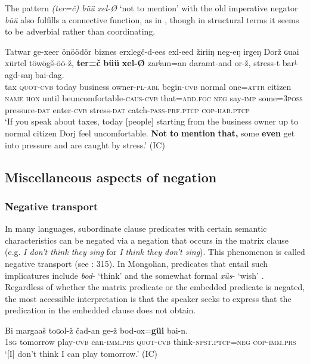 \documentclass[output=paper,colorlinks,citecolor=brown,chinesefont]{langscibook}
\begin{document}
The pattern \textit{(ter=č) büü xel-Ø} ‘not to mention’ with the old imperative negator \textit{büü} also fulfills a connective function, as in , though in structural terms it seems to be adverbial rather than coordinating.

\ea\label{ex:kha:83}
    \gll Tatwar ge-xeer önöödör biznes erxlegč-d-ees exl-eed žiriiŋ neg-eŋ irgeŋ Dorž ɢuai xürtel töwögš-öö-ž, \textbf{ter=č} \textbf{büü} \textbf{xel-Ø} zarʲam=an daramt-and or-ž, stress-t barʲ-agd-saŋ bai-dag. \\ 
         tax {\textsc{quot-cvb}} today business owner-\textsc{pl-abl} begin-\textsc{cvb} normal one=\textsc{attr} citizen \textsc{name} \textsc{hon} until be\textunderscore uncomfortable-\textsc{caus-cvb} that=\textsc{add.foc} \textsc{neg} say-\textsc{imp} some=\textsc{3poss} pressure-\textsc{dat} enter-\textsc{cvb} stress-\textsc{dat} catch-\textsc{pass-prf.ptcp} \textsc{cop-hab.ptcp} \\
    \glt ‘If you speak about taxes, today [people] starting from the business owner up to normal citizen Dorj feel uncomfortable. \textbf{Not} \textbf{to} \textbf{mention} \textbf{that,} some \textbf{even} get into pressure and are caught by stress.’ (IC)
\z

\subsection{Miscellaneous aspects of negation}\label{sec:kha:4.6}
\subsubsection{Negative transport}\label{sec:kha:4.6.1} 
\largerpage

In many languages, subordinate clause predicates with certain semantic characteristics can be negated via a negation that occurs in the matrix clause (e.g. \textit{I don’t think they sing} for \textit{I think they don't sing}). This phenomenon is called negative transport (see \citealt{Horn1989}: 315). In Mongolian, predicates that entail such implicatures include \textit{bod}{}- ‘think’  and the somewhat formal \textit{xüs}{}- ‘wish’ . Regardless of whether the matrix predicate or the embedded predicate is negated, the most accessible interpretation is that the speaker seeks to express that the predication in the embedded clause does not obtain.

\ea\label{ex:kha:84}
    \ea\label{ex:kha:84a}
        \gll Bi margaaš toɢol-ž čad-an ge-ž bod-ox=\textbf{güi} bai-n.\\ 
             \textsc{1sg} tomorrow play\textsc{{}-cvb}   can-\textsc{imm.prs} \textsc{quot-cvb} think-\textsc{npst.ptcp=neg} \textsc{cop-imm.prs} \\
        \glt ‘[I] don’t think I can play tomorrow.’ (IC)
    
\end{document}
